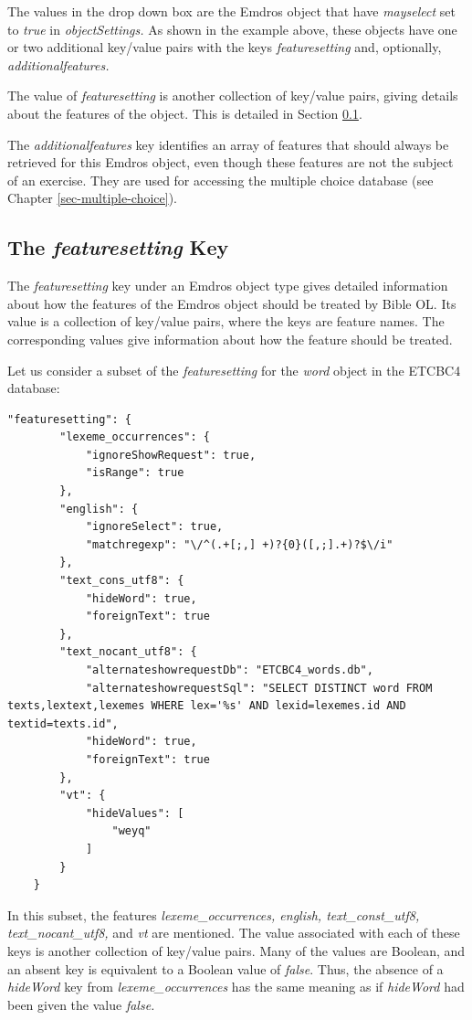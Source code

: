 \documentclass[11pt,oneside,a4paper]{memoir}
\begin{document}
The values in the drop down box are the Emdros object that have \emph{mayselect} set to \emph{true}
in \emph{objectSettings.} As shown in the example above, these objects have one or two additional
key/value pairs with the keys \emph{featuresetting} and, optionally, \emph{additionalfeatures.}

The value of \emph{featuresetting} is another collection of key/value pairs, giving
details about the features of the object. This is detailed in Section \ref{featuresetting}.

The \emph{additionalfeatures} key identifies an array of features that should always be retrieved
for this Emdros object, even though these features are not the subject of an exercise. They are used
for accessing the multiple choice database (see Chapter \ref{sec-multiple-choice}).

\subsection{The \emph{featuresetting} Key}\label{featuresetting}

The \emph{featuresetting} key under an Emdros object type gives detailed information about how the
features of the Emdros object should be treated by Bible OL. Its value is a collection of key/value
pairs, where the keys are feature names. The corresponding values give
information about how the feature should be treated.

Let us consider a subset of the \emph{featuresetting} for the \emph{word} object in the ETCBC4
database:

\begin{lstlisting}[escapechar=\#]
    "featuresetting": {
        "lexeme_occurrences": {
            "ignoreShowRequest": true,
            "isRange": true
        },
        "english": {
            "ignoreSelect": true,
            "matchregexp": "\/^(.+[;,] +)?{0}([,;].+)?$\/i"
        },
        "text_cons_utf8": {
            "hideWord": true,
            "foreignText": true
        },
        "text_nocant_utf8": {
            "alternateshowrequestDb": "ETCBC4_words.db",
            "alternateshowrequestSql": "SELECT DISTINCT word FROM texts,lextext,lexemes WHERE lex='%s' AND lexid=lexemes.id AND textid=texts.id",
            "hideWord": true,
            "foreignText": true
        },
        "vt": {
            "hideValues": [
                "weyq"
            ]
        }
    }
\end{lstlisting}

In this subset, the features \emph{lexeme\_occurrences, english, text\_const\_utf8,
  text\_nocant\_utf8,} and \emph{vt} are mentioned. The value associated with each of these keys is
another collection of key/value pairs. Many of the values are Boolean, and an absent key is
equivalent to a Boolean value of \emph{false}. Thus, the absence of a \emph{hideWord} key from
\emph{lexeme\_occurrences} has the same meaning as if \emph{hideWord} had been given the value
\emph{false.}
\end{document}
